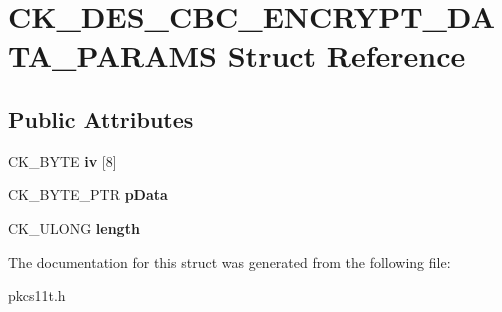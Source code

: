 \hypertarget{struct_c_k___d_e_s___c_b_c___e_n_c_r_y_p_t___d_a_t_a___p_a_r_a_m_s}{}\section{C\+K\+\_\+\+D\+E\+S\+\_\+\+C\+B\+C\+\_\+\+E\+N\+C\+R\+Y\+P\+T\+\_\+\+D\+A\+T\+A\+\_\+\+P\+A\+R\+A\+MS Struct Reference}
\label{struct_c_k___d_e_s___c_b_c___e_n_c_r_y_p_t___d_a_t_a___p_a_r_a_m_s}
\subsection*{Public Attributes}
\begin{DoxyCompactItemize}
\item 
\mbox{\label{struct_c_k___d_e_s___c_b_c___e_n_c_r_y_p_t___d_a_t_a___p_a_r_a_m_s_a2439d83107218803cd1ef0caa1209030}} 
C\+K\+\_\+\+B\+Y\+TE {\bfseries iv} \mbox{[}8\mbox{]}
\item 
\mbox{\label{struct_c_k___d_e_s___c_b_c___e_n_c_r_y_p_t___d_a_t_a___p_a_r_a_m_s_a343416d1be041ad6640040f910083699}} 
C\+K\+\_\+\+B\+Y\+T\+E\+\_\+\+P\+TR {\bfseries p\+Data}
\item 
\mbox{\label{struct_c_k___d_e_s___c_b_c___e_n_c_r_y_p_t___d_a_t_a___p_a_r_a_m_s_a407028625b00e4fbf76208d8216197f3}} 
C\+K\+\_\+\+U\+L\+O\+NG {\bfseries length}
\end{DoxyCompactItemize}


The documentation for this struct was generated from the following file\+:\begin{DoxyCompactItemize}
\item 
pkcs11t.\+h\end{DoxyCompactItemize}
